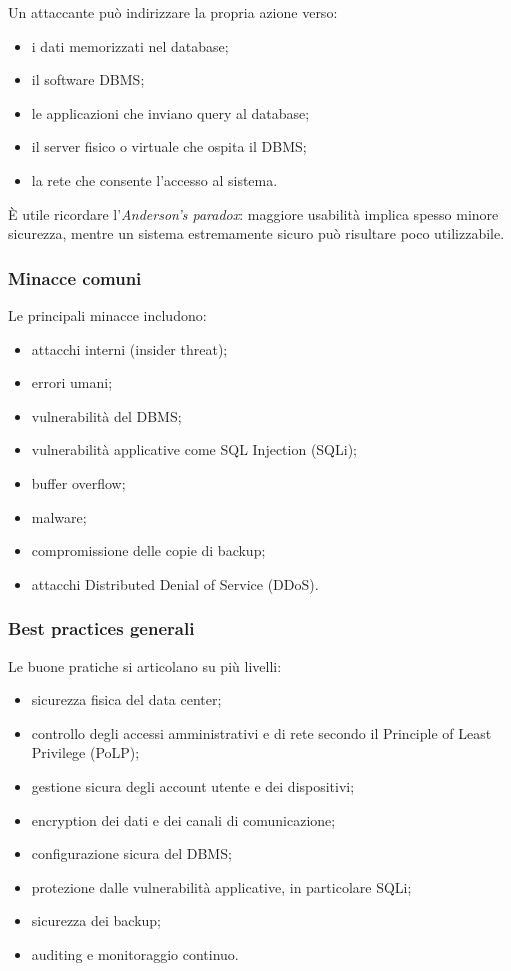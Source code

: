 Un attaccante può indirizzare la propria azione verso:
\begin{itemize}
    \item i dati memorizzati nel database;
    \item il software DBMS;
    \item le applicazioni che inviano query al database;
    \item il server fisico o virtuale che ospita il DBMS;
    \item la rete che consente l’accesso al sistema.
\end{itemize}

È utile ricordare l'\emph{Anderson’s paradox}: maggiore usabilità implica spesso minore sicurezza, mentre un sistema estremamente sicuro può risultare poco utilizzabile.

\subsubsection{Minacce comuni}

Le principali minacce includono:
\begin{itemize}
    \item attacchi interni (insider threat);
    \item errori umani;
    \item vulnerabilità del DBMS;
    \item vulnerabilità applicative come SQL Injection (SQLi);
    \item buffer overflow;
    \item malware;
    \item compromissione delle copie di backup;
    \item attacchi Distributed Denial of Service (DDoS).
\end{itemize}

\subsubsection{Best practices generali}

Le buone pratiche si articolano su più livelli:
\begin{itemize}
    \item sicurezza fisica del data center;
    \item controllo degli accessi amministrativi e di rete secondo il Principle of Least Privilege (PoLP);
    \item gestione sicura degli account utente e dei dispositivi;
    \item encryption dei dati e dei canali di comunicazione;
    \item configurazione sicura del DBMS;
    \item protezione dalle vulnerabilità applicative, in particolare SQLi;
    \item sicurezza dei backup;
    \item auditing e monitoraggio continuo.
\end{itemize}


